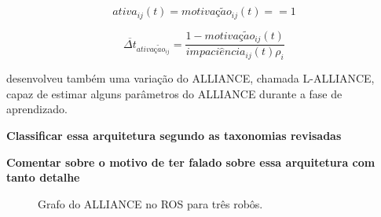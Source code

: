             \begin{equation} \label{eq:alliance_ativa_nova}
                ativa_{ij}(t) = motiva\textit{ç}\tilde{a}o_{ij}(t) == 1
            \end{equation}
            
            \begin{equation} \label{eq:alliance_estimativa_ativacao_nova}
                \overline{\Delta t}_{ativa\textit{ç}\tilde{a}o_{ij}} = \frac{1 - motiva\textit{ç}\tilde{a}o_{ij}(t)}{impaci\hat{e}ncia_{ij}(t) \rho_i}
            \end{equation}
            
             desenvolveu também uma variação do ALLIANCE, chamada L-ALLIANCE, capaz de estimar alguns parâmetros do ALLIANCE durante a fase de aprendizado.
            
            \textbf{\color{red} Classificar essa arquitetura segundo as taxonomias revisadas}
            
            \textbf{\color{red} Comentar sobre o motivo de ter falado sobre essa arquitetura com tanto detalhe}
            
            
            
            \begin{figure}[htb]
                \centering
                \resizebox{0.95\textwidth}{!}{}
                \caption{Grafo do ALLIANCE no ROS para três robôs.} \label{fig:rosgraph_alliance}
            \end{figure}